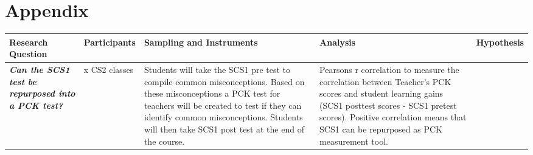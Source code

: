 ﻿\chapter*{Appendix}\label{appendix}

\begin{landscape}
	\begin{longtable}[]{@{}p{100pt} p{40pt}p{160pt} p{160pt} p{40pt} @{}}
	\toprule
	\begin{minipage}[b]{0.12\columnwidth}\raggedright\strut
	Research Question\strut
	\end{minipage} & \begin{minipage}[b]{0.02\columnwidth}\raggedright\strut
	Participants\strut
	\end{minipage} & \begin{minipage}[b]{0.34\columnwidth}\raggedright\strut
	Sampling and Instruments\strut
	\end{minipage} & \begin{minipage}[b]{0.30\columnwidth}\raggedright\strut
	Analysis\strut
	\end{minipage} & \begin{minipage}[b]{0.07\columnwidth}\raggedright\strut
	Hypothesis\strut
	\end{minipage}\tabularnewline
	\midrule
	\endhead
	\begin{minipage}[t]{0.12\columnwidth}\raggedright\strut
	\textbf{\emph{Can the SCS1 test be repurposed into a PCK test?}}\strut
	\end{minipage} & \begin{minipage}[t]{0.02\columnwidth}\raggedright\strut
	x CS2 classes\strut
	\end{minipage} & \begin{minipage}[t]{0.34\columnwidth}\raggedright\strut
	Students will take the SCS1 pre test to compile common misconceptions.
	Based on these misconceptions a PCK test for teachers will be created to
	test if they can identify common misconceptions. Students will then take
	SCS1 post test at the end of the course.\strut
	\end{minipage} & \begin{minipage}[t]{0.30\columnwidth}\raggedright\strut
	Pearsons r correlation to measure the correlation between Teacher's PCK
	scores and student learning gains (SCS1 posttest scores - SCS1 pretest
	scores). Positive correlation means that SCS1 can be repurposed as PCK
	measurement tool.\strut
	\end{minipage} & \begin{minipage}[t]{0.07\columnwidth}\raggedright\strut

\end{minipage}
\end{longtable}
\end{landscape}
